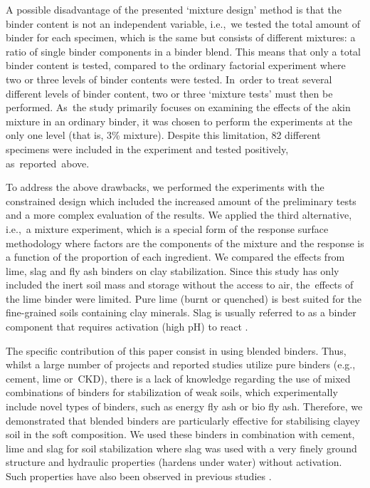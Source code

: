 \documentclass[constrmater,article,accept,pdftex,moreauthors]{Definitions/mdpi}
\begin{document}
A possible disadvantage of the presented ‘mixture design’ method is that the binder content is not an independent variable, i.e.,~we tested the total amount of binder for each specimen, which is the same but consists of different mixtures: a ratio of single binder components in a binder blend. This means that only a total binder content is tested, compared to the ordinary factorial experiment where two or three levels of binder contents were tested. In~order to treat several different levels of binder content, two or three ‘mixture tests’ must then be performed. As~the study primarily focuses on examining the effects of the akin mixture in an ordinary binder, it was chosen to perform the experiments at the only one level (that is, 3\% mixture). Despite this limitation, 82 different specimens were included in the experiment and tested positively, as~reported~above. 

To address the above drawbacks, we performed the experiments with the constrained design which included the increased amount of the preliminary tests and a more complex evaluation of the results. We applied the third alternative, i.e.,~a mixture experiment, which is a special form of the response surface methodology where factors are the components of the mixture and the response is a function of the proportion of each ingredient. We compared the effects from lime, slag and fly ash binders on clay stabilization. Since this study has only included the inert {soil mass} and storage without the access to air, the~effects of the lime binder were limited. Pure lime (burnt or quenched) is best suited for the fine-grained soils containing clay minerals. Slag is usually referred to as a binder component that requires activation (high pH) to react \citep{Sherwood,Lindh2022a}. 

The specific contribution of this paper consist in using blended binders. Thus, whilst a large number of projects and reported studies utilize pure binders (e.g., cement, lime or~CKD), there is a lack of knowledge regarding the use of mixed combinations of binders for stabilization of weak soils, which experimentally include novel types of binders, such as energy fly ash or bio fly ash. Therefore, we demonstrated that blended binders are particularly effective for stabilising clayey soil in the soft composition. We used these binders in combination with cement, lime and slag for soil stabilization where slag was used with a very finely ground structure and hydraulic properties (hardens under water) without activation. Such properties have also been observed in previous studies \citep{Lindh2000,Lindh2001}. 
\end{document}
